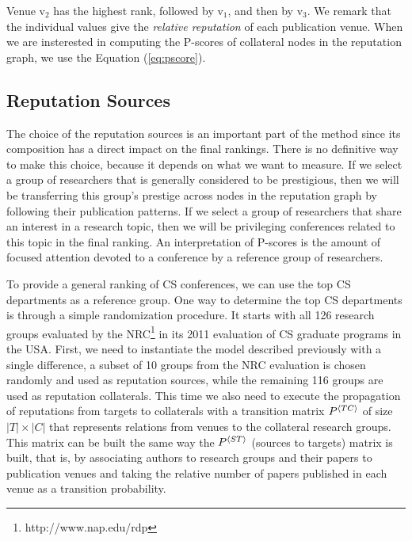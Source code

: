 \documentclass[notitlepage]{svjour3}
\begin{document}
Venue $\mbox{v}_2$ has the highest rank, followed by $\mbox{v}_1$, and then by $\mbox{v}_3$. We remark that the individual values give the {\em relative reputation} of each publication venue. 
%
When we are insterested in computing the P-scores of collateral nodes in the reputation graph, we use the Equation (\ref{eq:pscore}).


\subsection{Reputation Sources}
\label{sec:rep-sources}

The choice of the reputation sources is an important part of the method since 
its composition has a direct impact on the final rankings. 
There is no definitive way to make this choice, because it depends on what we want 
to measure. If we select a group of researchers that is generally considered 
to be prestigious, then we will be transferring this group's prestige across nodes in the 
reputation graph by following their publication patterns. If we select a group of 
researchers that share an interest in a research topic, then we will be privileging
conferences related to this topic in the final ranking. An interpretation 
of P-scores is the amount of focused attention devoted to a conference by a reference group of 
researchers.

To provide a general ranking of CS conferences, we can use the top CS departments as 
a reference group.
One way to determine the top CS departments is through a simple randomization procedure.
It starts with all 126 research groups evaluated by the NRC\footnote{http://www.nap.edu/rdp}
in its 2011 evaluation of CS graduate programs in the USA. 
First, we need to instantiate the model described previously with a single difference, 
a subset of 10 groups from the NRC evaluation is chosen randomly and used as reputation sources, while the remaining 116 groups
are used as reputation collaterals. This time we also need to execute the propagation of reputations 
from targets to collaterals with a transition matrix $P{^{\langle TC \rangle}}$ of size $|T|\times |C|$ that represents
relations from venues to the collateral research groups. This matrix can be built the same way
the $P{^{\langle ST \rangle}}$ (sources to targets) matrix is built, that is, by associating authors to research 
groups and their papers to publication venues and taking the relative number of papers published
in each venue as a transition probability.
\end{document}
